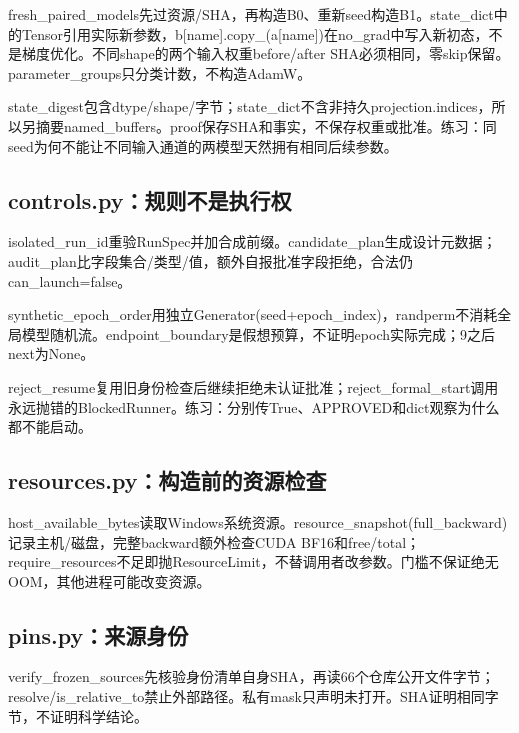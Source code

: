 \documentclass[UTF8,fontset=fandol,10pt]{ctexart}
\begin{document}
fresh\_\allowbreak{}paired\_\allowbreak{}models先过资源/\allowbreak{}SHA，再构造B0、重新seed构造B1。state\_\allowbreak{}dict中的Tensor引用实际新参数，b[name].copy\_\allowbreak{}(a[name])在no\_\allowbreak{}grad中写入新初态，不是梯度优化。不同shape的两个输入权重before/\allowbreak{}after SHA必须相同，零skip保留。parameter\_\allowbreak{}groups只分类计数，不构造AdamW。

state\_\allowbreak{}digest包含dtype/\allowbreak{}shape/\allowbreak{}字节；state\_\allowbreak{}dict不含非持久projection.indices，所以另摘要named\_\allowbreak{}buffers。proof保存SHA和事实，不保存权重或批准。练习：同seed为何不能让不同输入通道的两模型天然拥有相同后续参数。

\subsection{controls.py：规则不是执行权}

isolated\_\allowbreak{}run\_\allowbreak{}id重验RunSpec并加合成前缀。candidate\_\allowbreak{}plan生成设计元数据；audit\_\allowbreak{}plan比字段集合/\allowbreak{}类型/\allowbreak{}值，额外自报批准字段拒绝，合法仍can\_\allowbreak{}launch=false。

synthetic\_\allowbreak{}epoch\_\allowbreak{}order用独立Generator(seed+epoch\_\allowbreak{}index)，randperm不消耗全局模型随机流。endpoint\_\allowbreak{}boundary是假想预算，不证明epoch实际完成；9之后next为None。

reject\_\allowbreak{}resume复用旧身份检查后继续拒绝未认证批准；reject\_\allowbreak{}formal\_\allowbreak{}start调用永远抛错的BlockedRunner。练习：分别传True、APPROVED和dict观察为什么都不能启动。

\subsection{resources.py：构造前的资源检查}

host\_\allowbreak{}available\_\allowbreak{}bytes读取Windows系统资源。resource\_\allowbreak{}snapshot(full\_\allowbreak{}backward)记录主机/\allowbreak{}磁盘，完整backward额外检查CUDA BF16和free/\allowbreak{}total；require\_\allowbreak{}resources不足即抛ResourceLimit，不替调用者改参数。门槛不保证绝无OOM，其他进程可能改变资源。

\subsection{pins.py：来源身份}

verify\_\allowbreak{}frozen\_\allowbreak{}sources先核验身份清单自身SHA，再读66个仓库公开文件字节；resolve/\allowbreak{}is\_\allowbreak{}relative\_\allowbreak{}to禁止外部路径。私有mask只声明未打开。SHA证明相同字节，不证明科学结论。
\end{document}
